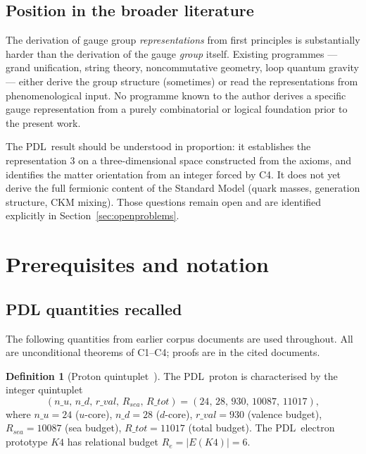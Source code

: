 \documentclass[11pt,a4paper]{article}
\def\Kfour{K4}%
\def\Re{Re}%
\def\PDL{PDL}%
\def\mathrm#1{#1}%
\def\mathbf#1{#1}%
\def\textsc#1{#1}%
\def\nuu{n\_u}%
\def\ndd{n\_d}%
\def\Rtot{R\_tot}%
\def\rval{r\_val}%
\theoremstyle{plain}
\theoremstyle{definition}
\newtheorem{definition}[theorem]{Definition}
\theoremstyle{remark}
\newcommand{\PDL}{\textsc{PDL}}
\newcommand{\Kfour}{K_4}
\renewcommand{\Re}{R_e}
\newcommand{\Rtot}{R_{\mathrm{tot}}}
\newcommand{\rval}{r_{\mathrm{val}}}
\newcommand{\nuu}{n_u}
\newcommand{\ndd}{n_d}
\begin{document}
\subsection{Position in the broader literature}

The derivation of gauge group \emph{representations} from first principles is substantially harder than the derivation of the gauge \emph{group} itself. Existing programmes --- grand unification, string theory, noncommutative geometry, loop quantum gravity --- either derive the group structure (sometimes) or read the representations from phenomenological input. No programme known to the author derives a specific gauge representation from a purely combinatorial or logical foundation prior to the present work.

The \PDL\ result should be understood in proportion: it establishes the representation $\mathbf{3}$ on a three-dimensional space constructed from the axioms, and identifies the matter orientation from an integer forced by C4. It does not yet derive the full fermionic content of the Standard Model (quark masses, generation structure, CKM mixing). Those questions remain open and are identified explicitly in Section~\ref{sec:openproblems}.

\section{Prerequisites and notation}
\label{sec:prereq}

\subsection{PDL quantities recalled}

The following quantities from earlier corpus documents are used throughout. All are unconditional theorems of C1--C4; proofs are in the cited documents.

\begin{definition}[Proton quintuplet~{\cite{PDL_D47,PDL_D29}}]
The \PDL\ proton is characterised by the integer quintuplet
\[
(\nuu,\, \ndd,\, \rval,\, R_{\mathrm{sea}},\, \Rtot) = (24,\, 28,\, 930,\, 10087,\, 11017),
\]
where $\nuu = 24$ ($u$-core), $\ndd = 28$ ($d$-core), $\rval = 930$ (valence budget), $R_{\mathrm{sea}} = 10087$ (sea budget), $\Rtot = 11017$ (total budget). The \PDL\ electron prototype $\Kfour$ has relational budget $\Re = |E(\Kfour)| = 6$.
\end{definition}
\end{document}
